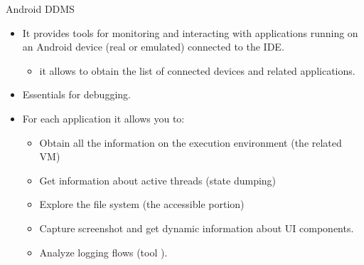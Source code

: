 \documentclass{beamer}
\begin{document}
  \begin{frame}{Android DDMS}
    \begin{itemize}
      \item It provides tools for monitoring and interacting with applications
      running on an Android device (real or emulated) connected to the IDE.
      \begin{itemize}
        \item it allows to obtain the list of connected devices and related
        applications. 
      \end{itemize}
      \item Essentials for debugging.
      \item For each application it allows you to:
      \begin{itemize}
        \item Obtain all the information on the execution environment (the
        related VM)
        \item Get information about active threads (state dumping)
        \item Explore the file system (the accessible portion)
        \item Capture screenshot and get dynamic information about UI
        components. 
        \item Analyze logging flows (tool ).
      \end{itemize}
    \end{itemize}
  \end{frame}
\end{document}

